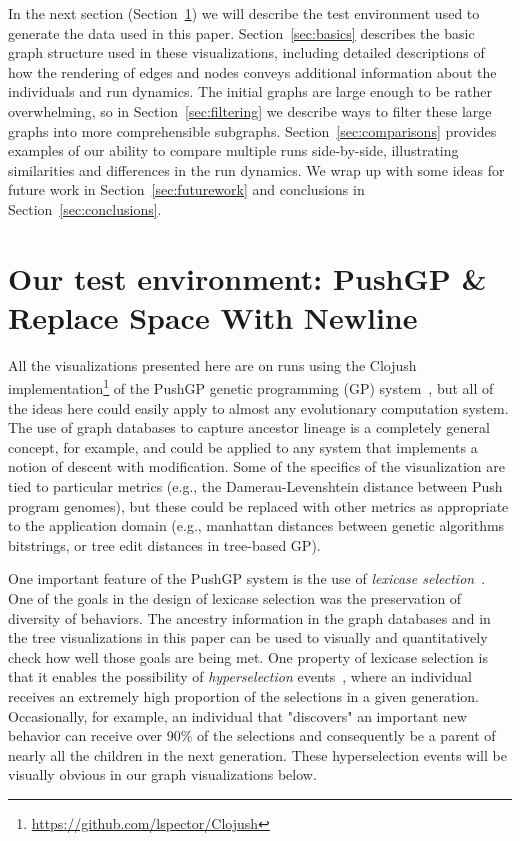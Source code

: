 \documentclass{sig-alternate}
\begin{document}
In the next section (Section~\ref{sec:testEnv}) we will describe the test
environment used to generate the data used in this paper. Section~\ref{sec:basics}
describes the basic graph structure used in these visualizations, including
detailed descriptions of how the rendering of edges and nodes conveys additional
information about the individuals and run dynamics. The initial graphs are large
enough to be rather overwhelming, so in Section~\ref{sec:filtering} we describe
ways to filter these large graphs into more comprehensible subgraphs. 
Section~\ref{sec:comparisons} provides examples of our ability to compare multiple
runs side-by-side, illustrating similarities and differences in the run dynamics.
We wrap up with some ideas for future work in Section~\ref{sec:futurework} and
conclusions in Section~\ref{sec:conclusions}.

\section{Our test environment: PushGP \& Replace Space With Newline}
\label{sec:testEnv}

All the visualizations presented here are on runs using the Clojush
implementation\footnote{\url{https://github.com/lspector/Clojush}} of the 
PushGP genetic programming (GP) system~\cite{1068292,spector:2002:GPEM}, 
but all of the ideas here
could easily apply to almost any evolutionary computation system. The use
of graph databases to capture ancestor lineage is a completely general
concept, for example, and could be applied to any system that implements a
notion of descent with modification. Some of the specifics of the visualization
are tied to particular metrics (e.g., the Damerau-Levenshtein distance
between Push program genomes), but these could be replaced with other
metrics as appropriate to the application domain (e.g., manhattan distances
between genetic algorithms bitstrings, or tree edit distances in
tree-based GP).

One important feature of the PushGP system is the use of \emph{lexicase
selection}~\cite{Helmuth:2015:ieeeTEC}. One of the goals in the design of
lexicase selection was the preservation of diversity of behaviors. The
ancestry information in the graph databases and in the tree visualizations 
in this paper can be used to visually and quantitatively check how
well those goals are being met. One property of lexicase selection is
that it enables the possibility of \emph{hyperselection} events~\cite{Helmuth:2016:GECCO},
where an individual receives an extremely high proportion of the selections
in a given generation. Occasionally, for example, an individual that
"discovers" an important new behavior can receive over 90\% of the selections
and consequently be a parent of nearly all the children in the next generation.
These hyperselection events will be visually obvious in our graph visualizations
below.
\end{document}
